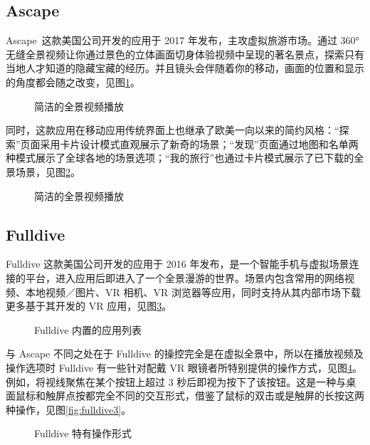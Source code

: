 \subsection{Ascape}

Ascape 这款美国公司开发的应用于 2017 年发布，主攻虚拟旅游市场。通过 360° 无缝全景视频让你通过景色的立体画面切身体验视频中呈现的著名景点，探索只有当地人才知道的隐藏宝藏的经历。并且镜头会伴随着你的移动，画面的位置和显示的角度都会随之改变，见图\ref{fig:ascape1}。

\begin{figure}[htp]
\centering
{}
\caption{简洁的全景视频播放}
\label{fig:ascape1}
\end{figure}

同时，这款应用在移动应用传统界面上也继承了欧美一向以来的简约风格：“探索”页面采用卡片设计模式直观展示了新奇的场景；“发现”页面通过地图和名单两种模式展示了全球各地的场景选项；“我的旅行”也通过卡片模式展示了已下载的全景场景，见图\ref{fig:ascape2}。

\begin{figure}[htp]
\centering
{}
\caption{简洁的全景视频播放}
\label{fig:ascape2}
\end{figure}

\subsection{Fulldive}

Fulldive 这款美国公司开发的应用于 2016 年发布，是一个智能手机与虚拟场景连接的平台，进入应用后即进入了一个全景漫游的世界。场景内包含常用的网络视频、本地视频／图片、VR 相机、VR 浏览器等应用，同时支持从其内部市场下载更多基于其开发的 VR 应用，见图\ref{fig:fulldive1}。

\begin{figure}[htp]
\centering
{}
\caption{Fulldive 内置的应用列表}
\label{fig:fulldive1}
\end{figure}

与 Ascape 不同之处在于 Fulldive 的操控完全是在虚拟全景中，所以在播放视频及操作选项时 Fulldive 有一些针对配戴 VR 眼镜者所特别提供的操作方式，见图\ref{fig:fulldive2}。例如，将视线聚焦在某个按钮上超过 3 秒后即视为按下了该按钮。这是一种与桌面鼠标和触屏点按都完全不同的交互形式，借鉴了鼠标的双击或是触屏的长按这两种操作，见图\ref{fig:fulldive3}。

\begin{figure}[htp]
\centering
{}
\caption{Fulldive 特有操作形式}
\label{fig:fulldive2}
\end{figure}

